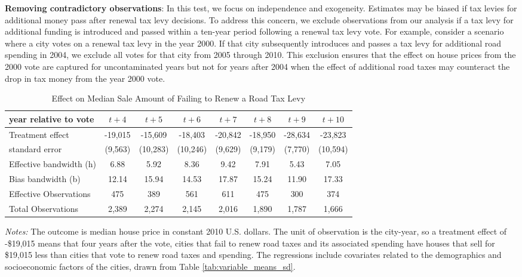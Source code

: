 \vskip 0.5cm

\textbf{Removing contradictory observations}: In this test, we focus on independence and exogeneity. Estimates may be biased if tax levies for additional money pass after renewal tax levy decisions.
To address this concern, we exclude observations from our analysis if a tax levy for additional funding is introduced and passed within a ten-year period following a renewal tax levy vote. 
For example, consider a scenario where a city votes on a renewal tax levy in the year 2000. If that city subsequently introduces and passes a tax levy for additional road spending in 2004, we exclude all votes for that city from 2005 through 2010. This exclusion ensures that the effect on house prices from the 2000 vote are captured for uncontaminated years but not for years after 2004 when the effect of additional road taxes may counteract the drop in tax money from the year 2000 vote.

\begin{table}[ht]
    \centering
    \caption{Effect on Median Sale Amount of Failing to Renew a Road Tax Levy}
    \label{tab:uncontaminated}
    \begin{tabular}{p{2.8cm}ccccccc}
        \hline
        year relative to vote & $t + 4$ & $t + 5$ & $t + 6$ & $t + 7$ & $t + 8$ & $t + 9$ & $t + 10$ \\
        \hline
        Treatment effect & -19,015 & -15,609 & -18,403 & -20,842 & -18,950 & -28,634 & -23,823 \\
        standard error   & (9,563) & (10,283) & (10,246) & (9,629) & (9,179) & (7,770)  & (10,594) \\
        Effective bandwidth (h) & 6.88 & 5.92 & 8.36 & 9.42 & 7.91 & 5.43 & 7.05 \\
        Bias bandwidth (b)      & 12.14 & 15.94 & 14.53 & 17.87 & 15.24 & 11.90 & 17.33 \\
        Effective Observations  & 475 & 389 & 561 & 611 & 475 & 300 & 374 \\
        Total Observations      & 2,389 & 2,274 & 2,145 & 2,016 & 1,890 & 1,787 & 1,666 \\
        \hline
    \end{tabular}
    \begin{tablenotes}
        \small
        \item \textit{Notes:} The outcome is median house price in constant 2010 U.S. dollars. The unit of observation is the city-year, so a treatment effect of -\$19,015 means that four years after the vote, cities that fail to renew road taxes and its associated spending have houses that sell for \$19,015 less than cities that vote to renew road taxes and spending. The regressions include covariates related to the demographics and socioeconomic factors of the cities, drawn from Table \ref{tab:variable_means_sd}.
    \end{tablenotes}
\end{table}


